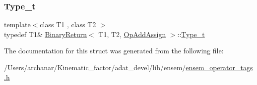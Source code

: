 \mbox{\label{structBinaryReturn_3_01T1_00_01T2_00_01OpAddAssign_01_4_ac69ceb90c901b063de9f436ab55169f5}} 
\subsubsection{\texorpdfstring{Type\_t}{Type\_t}\hspace{0.1cm}{\footnotesize\ttfamily [2/2]}}
{\footnotesize\ttfamily template$<$class T1 , class T2 $>$ \\
typedef T1\& \mbox{\hyperlink{structBinaryReturn}{Binary\+Return}}$<$ T1, T2, \mbox{\hyperlink{structOpAddAssign}{Op\+Add\+Assign}} $>$\+::\mbox{\hyperlink{structBinaryReturn_3_01T1_00_01T2_00_01OpAddAssign_01_4_ac69ceb90c901b063de9f436ab55169f5}{Type\+\_\+t}}}



The documentation for this struct was generated from the following file\+:\begin{DoxyCompactItemize}
\item 
/\+Users/archanar/\+Kinematic\+\_\+factor/adat\+\_\+devel/lib/ensem/\mbox{\hyperlink{lib_2ensem_2ensem__operator__tags_8h}{ensem\+\_\+operator\+\_\+tags.\+h}}\end{DoxyCompactItemize}
